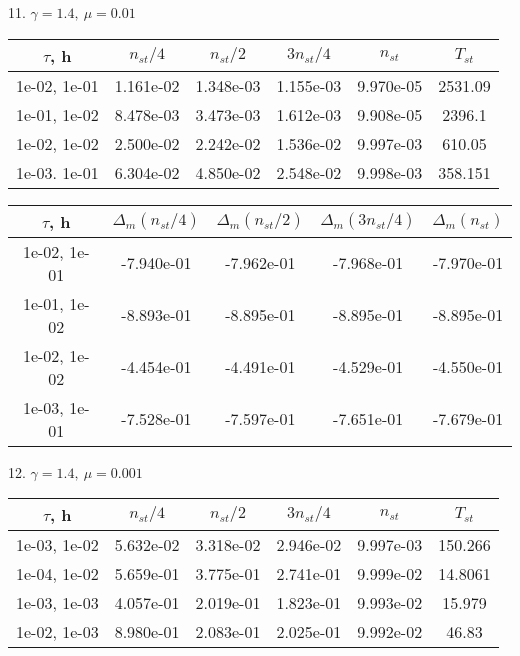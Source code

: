 11. $\gamma = 1.4, \ \mu = 0.01$
\begin{center}
	\begin{tabular}{ |c|c|c|c|c|c| } 
		\hline
		$\tau$, h & $n_{st}/ 4$ & $n_{st}/ 2$ & $3n_{st}/ 4$ & $n_{st}$ & $T_{st}$ \\ 
		\hline
		1e-02, 1e-01 & 1.161e-02 & 1.348e-03 & 1.155e-03 & 9.970e-05 & 2531.09\\ 
		\hline
		1e-01, 1e-02 & 8.478e-03 & 3.473e-03 & 1.612e-03 & 9.908e-05 & 2396.1\\ 
		\hline
		1e-02, 1e-02 & 2.500e-02 & 2.242e-02 & 1.536e-02 & 9.997e-03 & 610.05\\ 
		\hline
		1e-03. 1e-01 & 6.304e-02 & 4.850e-02 & 2.548e-02 & 9.998e-03 & 358.151\\ 
		\hline
	\end{tabular}
\end{center}

\begin{center}
	\begin{tabular}{ |c|c|c|c|c| } 
		\hline
		$\tau$, h & $\Delta_m (n_{st}/ 4)$ & $\Delta_m (n_{st}/ 2)$ & $\Delta_m (3n_{st}/ 4)$ & $\Delta_m (n_{st})$ \\ 
		\hline
		1e-02, 1e-01 & -7.940e-01 & -7.962e-01 & -7.968e-01 & -7.970e-01 \\ 
		\hline
		1e-01, 1e-02 & -8.893e-01 & -8.895e-01 & -8.895e-01 & -8.895e-01 \\ 
		\hline
		1e-02, 1e-02 & -4.454e-01 & -4.491e-01 & -4.529e-01 & -4.550e-01 \\ 
		\hline
		1e-03, 1e-01 & -7.528e-01 & -7.597e-01 & -7.651e-01 & -7.679e-01 \\ 
		\hline
	\end{tabular}
\end{center}

12. $\gamma = 1.4, \ \mu = 0.001$
\begin{center}
	\begin{tabular}{ |c|c|c|c|c|c| } 
		\hline
		$\tau$, h & $n_{st}/ 4$ & $n_{st}/ 2$ & $3n_{st}/ 4$ & $n_{st}$ & $T_{st}$ \\ 
		\hline
		1e-03, 1e-02 & 5.632e-02 & 3.318e-02 & 2.946e-02 & 9.997e-03 & 150.266\\ 
		\hline
		1e-04, 1e-02 & 5.659e-01 & 3.775e-01 & 2.741e-01 & 9.999e-02 & 14.8061\\ 
		\hline
		1e-03, 1e-03 & 4.057e-01 & 2.019e-01 & 1.823e-01 & 9.993e-02 & 15.979\\ 
		\hline
		1e-02, 1e-03 & 8.980e-01 & 2.083e-01 & 2.025e-01 & 9.992e-02 & 46.83\\ 
		\hline
	\end{tabular}
\end{center}

